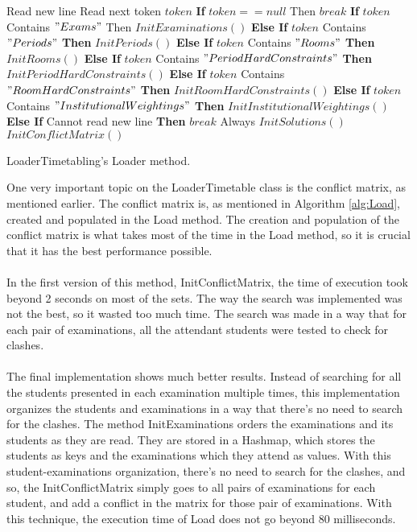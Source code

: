 \begin{algorithm}[b!]
\begin{algorithmic}
\State Read new line
\Repeat
	\State Read next token $token$
	\State \textbf{If} $token == null$ Then $break$ 
	\State \textbf{If} $token$ Contains $"Exams"$ Then $InitExaminations()$
	\State \textbf{Else If} $token$ Contains $"Periods"$ \textbf{Then} $InitPeriods()$
	\State \textbf{Else If} $token$ Contains $"Rooms"$ \textbf{Then} $InitRooms()$
	\State \textbf{Else If} $token$ Contains $"PeriodHardConstraints"$ \textbf{Then} $InitPeriodHardConstraints()$
	\State \textbf{Else If} $token$ Contains $"RoomHardConstraints"$ \textbf{Then} $InitRoomHardConstraints()$
	\State \textbf{Else If} $token$ Contains $"InstitutionalWeightings"$ \textbf{Then} $InitInstitutionalWeightings()$
	\State \textbf{Else If} Cannot read new line \textbf{Then} $break$ 
\Until Always
\State $InitSolutions()$
\State $InitConflictMatrix()$
\end{algorithmic}
\caption{LoaderTimetabling's Loader method.}
\label{alg:Load}
\end{algorithm}
One very important topic on the LoaderTimetable class is the conflict matrix, as mentioned earlier. The conflict matrix is, as mentioned in Algorithm \ref{alg:Load}, created and populated in the Load method. The creation and population of the conflict matrix is what takes most of the time in the Load method, so it is crucial that it has the best performance possible.\\
\\
In the first version of this method, InitConflictMatrix, the time of execution took beyond 2 seconds on most of the sets. The way the search was implemented was not the best, so it wasted too much time. The search was made in a way that for each pair of examinations, all the attendant students were tested to check for clashes.\\
\\
The final implementation shows much better results. Instead of searching for all the students presented in each examination multiple times, this implementation organizes the students and examinations in a way that there's no need to search for the clashes. The method InitExaminations orders the examinations and its students as they are read. They are stored in a Hashmap, which stores the students as keys and the examinations which they attend as values. With this student-examinations organization, there's no need to search for the clashes, and so, the InitConflictMatrix simply goes to all pairs of examinations for each student, and add a conflict in the matrix for those pair of examinations. With this technique, the execution time of Load does not go beyond 80 milliseconds.

